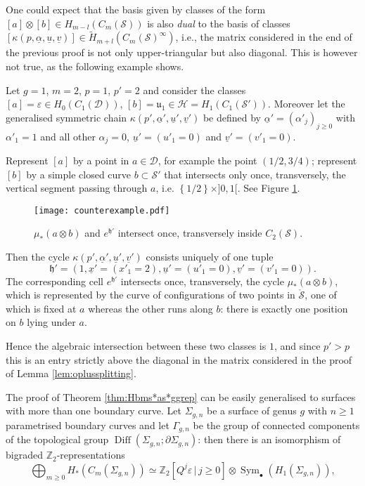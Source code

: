 \documentclass{amsart}
\theoremstyle{plain}
\theoremstyle{definition}
\newcommand{\D}{\mathcal{D}}
\renewcommand{\H}{\mathcal{H}}
\renewcommand{\S}{\mathcal{S}}
\renewcommand{\u}{\mathfrak{u}}
\newcommand{\Z}{\mathbb{Z}}
\newcommand{\cms}{C_m(\S)}
\newcommand{\tup}{\mathfrak{h}}
\newcommand{\tH}{\tilde{H}}
\newcommand{\pa}[1]{\left(#1\right)}
\newcommand{\set}[1]{\left\{#1\right\}}
\newcommand{\mrS}{\mathring{\S}}
\newcommand{\ux}{\underline{x}}
\newcommand{\uu}{\underline{u}}
\newcommand{\uv}{\underline{v}}
\newcommand{\ualpha}{\underline{\alpha}}
\renewcommand{\epsilon}{\varepsilon}
\DeclareMathOperator{\Diff}{Diff}
\DeclareMathOperator{\Sym}{Sym}
\begin{document}
One could expect that the basis given by classes of the form $[a]\otimes [b]\in H_{m-l}(\cms)$
is also \emph{dual} to the basis of classes $[\kappa(p,\ualpha,\uu,\uv)]\in \tH_{m+l}(\cms^{\infty})$, i.e., the
matrix considered in the end of the previous proof is not only upper-triangular but also
diagonal. This is however not true, as the following example shows.

Let $g=1$, $m=2$, $p=1$, $p'=2$ and consider the classes $[a]=\epsilon\in H_0(C_1(\D))$,
$[b]=\u_1\in \H=H_1(C_1(\S'))$. Moreover let the generalised symmetric chain
$\kappa(p',\ualpha',\uu',\uv')$ be defined by
$\ualpha'=(\alpha'_j)_{j\geq 0}$ with $\alpha'_1=1$ and all other $\alpha_j=0$, $\uu'=(u'_1=0)$
and $\uv'=(v'_1=0)$.

Represent $[a]$ by a point in $a\in\D$, for example
the point $(1/2,3/4)$; represent $[b]$ by a simple closed curve $b\subset\S'$
that intersects only once, transversely, the vertical segment passing through $a$, i.e.
$\set{1/2}\times]0,1[$. See Figure \ref{fig:counterexample}.

\begin{figure}[ht]\centering
 \texttt{[image: counterexample.pdf]}
 \caption{$\mu_*(a\otimes b)$ and $e^{\tup'}$ intersect once, transversely inside $C_2(\S)$.}
\label{fig:counterexample}
\end{figure}

Then the cycle $\kappa(p',\ualpha',\uu',\uv')$ consists uniquely of one tuple
\[
\tup'=(1,\ux'=(x'_1=2),\uu'=(u'_1=0),\uv'=(v'_1=0)).
\]
The corresponding cell $e^{\tup'}$ intersects once, transversely,
the cycle $\mu_*(a\otimes b)$, which is represented by the curve of configurations of two
points in $\mrS$, one of which is fixed at $a$ whereas the other runs along $b$:
there is exactly one position on $b$ lying under $a$.

Hence the algebraic intersection between these two classes is $1$, and since $p'>p$
this is an entry strictly above the diagonal in the matrix considered in the proof
of Lemma \ref{lem:oplussplitting}.

The proof of Theorem \ref{thm:Hbms*as*ggrep} can be easily generalised to surfaces
with more than one boundary curve. Let $\Sigma_{g,n}$ be a surface of genus
$g$ with $n\geq 1$ parametrised boundary curves and let $\Gamma_{g,n}$ be
the group of connected components of the topological group
$\Diff(\Sigma_{g,n};\partial\Sigma_{g,n})$:
then there is an isomorphism of bigraded $\Z_2$-representations
\begin{equation}
\label{eq:sgn}
\bigoplus_{m\geq 0}H_*\pa{C_m(\Sigma_{g,n})}\simeq \Z_2\left[Q^j\epsilon\,|\, j\geq 0\right]\otimes\Sym_{\bullet}(H_1(\Sigma_{g,n})),
\end{equation}
\end{document}

